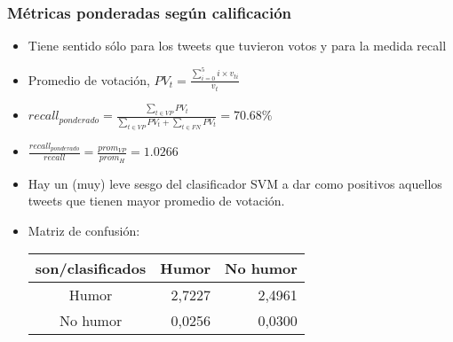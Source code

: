 \begin{frame}
    \frametitle{Métricas ponderadas según calificación}

    \begin{itemize}[<+->]
        \item Tiene sentido sólo para los tweets que tuvieron votos y para la medida recall
        \item Promedio de votación, $PV_t = \frac{\sum_{i = 0}^{5} i \times v_{ti}}{v_t}$
        \item $recall_{ponderado} = \frac{\sum_{t \in VP} PV_t} {\sum_{t \in VP} PV_t + \sum_{t \in FN} PV_t} = 70.68\%$
        \item $\frac{recall_{ponderado}}{recall} = \frac{prom_{VP}}{prom_H} = 1.0266$
        \item Hay un (muy) leve sesgo del clasificador SVM a dar como positivos aquellos tweets que tienen mayor promedio de votación.
        \item Matriz de confusión:

        \begin{center}
            \begin{tabular}{ c | r | r }
                \textbf{son/clasificados} & Humor & No humor \\
                \hline
                Humor & 2,7227 & 2,4961 \\
                \hline
                No humor & 0,0256 & 0,0300 \\
            \end{tabular}
        \end{center}
    \end{itemize}
\end{frame}

